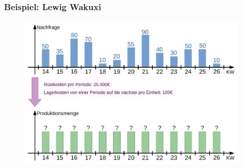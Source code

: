 \begin{frame}
 \frametitle{Beispiel: Lewig Wakuxi}
 \begin{figure}
  \centering
  \includegraphics[width=\linewidth]{Bilder/WagnerWhitinProblem}
 \end{figure}
\end{frame}

